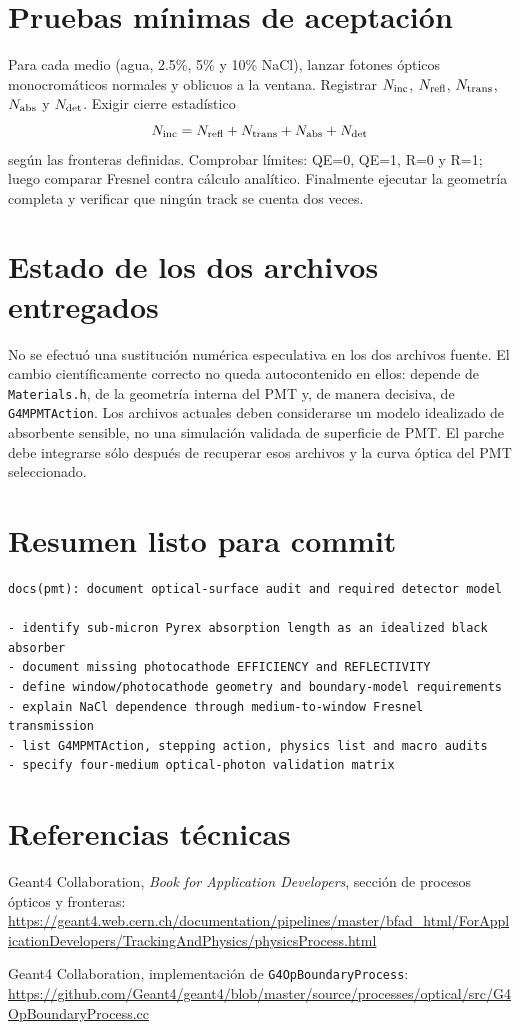 \documentclass[11pt,a4paper]{article}
\begin{document}
\section{Pruebas mínimas de aceptación}
Para cada medio (agua, 2.5\%, 5\% y 10\% NaCl), lanzar fotones ópticos
monocromáticos normales y oblicuos a la ventana. Registrar $N_{\rm inc}$,
$N_{\rm refl}$, $N_{\rm trans}$, $N_{\rm abs}$ y $N_{\rm det}$. Exigir cierre
estadístico
\[
N_{\rm inc}=N_{\rm refl}+N_{\rm trans}+N_{\rm abs}+N_{\rm det}
\]
según las fronteras definidas. Comprobar límites: QE=0, QE=1, R=0 y R=1; luego
comparar Fresnel contra cálculo analítico. Finalmente ejecutar la geometría
completa y verificar que ningún track se cuenta dos veces.

\section{Estado de los dos archivos entregados}
No se efectuó una sustitución numérica especulativa en los dos archivos fuente.
El cambio científicamente correcto no queda autocontenido en ellos: depende de
\texttt{Materials.h}, de la geometría interna del PMT y, de manera decisiva, de
\texttt{G4MPMTAction}. Los archivos actuales deben considerarse un modelo
idealizado de absorbente sensible, no una simulación validada de superficie de
PMT. El parche debe integrarse sólo después de recuperar esos archivos y la
curva óptica del PMT seleccionado.

\section{Resumen listo para commit}
\begin{lstlisting}
docs(pmt): document optical-surface audit and required detector model

- identify sub-micron Pyrex absorption length as an idealized black absorber
- document missing photocathode EFFICIENCY and REFLECTIVITY
- define window/photocathode geometry and boundary-model requirements
- explain NaCl dependence through medium-to-window Fresnel transmission
- list G4MPMTAction, stepping action, physics list and macro audits
- specify four-medium optical-photon validation matrix
\end{lstlisting}

\section{Referencias técnicas}
Geant4 Collaboration, \emph{Book for Application Developers}, sección de
procesos ópticos y fronteras: \\
\url{https://geant4.web.cern.ch/documentation/pipelines/master/bfad_html/ForApplicationDevelopers/TrackingAndPhysics/physicsProcess.html}

Geant4 Collaboration, implementación de \texttt{G4OpBoundaryProcess}: \\
\url{https://github.com/Geant4/geant4/blob/master/source/processes/optical/src/G4OpBoundaryProcess.cc}
\end{document}
